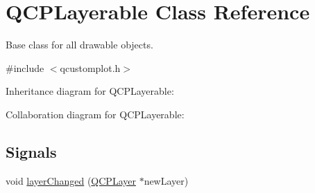 \hypertarget{class_q_c_p_layerable}{}\section{Q\+C\+P\+Layerable Class Reference}
\label{class_q_c_p_layerable}


Base class for all drawable objects.  




{\ttfamily \#include $<$qcustomplot.\+h$>$}



Inheritance diagram for Q\+C\+P\+Layerable\+:


Collaboration diagram for Q\+C\+P\+Layerable\+:
\subsection*{Signals}
\begin{DoxyCompactItemize}
\item 
void \hyperlink{class_q_c_p_layerable_abbf8657cedea73ac1c3499b521c90eba}{layer\+Changed} (\hyperlink{class_q_c_p_layer}{Q\+C\+P\+Layer} $\ast$new\+Layer)
\end{DoxyCompactItemize}
